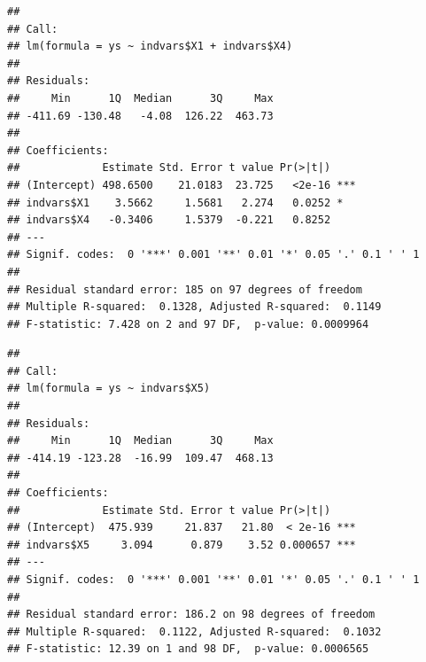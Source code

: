 \documentclass[
]{book}
\newenvironment{Shaded}{\begin{snugshade}}{\end{snugshade}}
\newcommand{\FunctionTok}[1]{\textcolor[rgb]{0.00,0.00,0.00}{#1}}
\newcommand{\NormalTok}[1]{#1}
\newcommand{\OtherTok}[1]{\textcolor[rgb]{0.56,0.35,0.01}{#1}}
\newcommand{\SpecialCharTok}[1]{\textcolor[rgb]{0.00,0.00,0.00}{#1}}
\begin{document}
\begin{Shaded}
\end{Shaded}

\begin{verbatim}
## 
## Call:
## lm(formula = ys ~ indvars$X1 + indvars$X4)
## 
## Residuals:
##     Min      1Q  Median      3Q     Max 
## -411.69 -130.48   -4.08  126.22  463.73 
## 
## Coefficients:
##             Estimate Std. Error t value Pr(>|t|)    
## (Intercept) 498.6500    21.0183  23.725   <2e-16 ***
## indvars$X1    3.5662     1.5681   2.274   0.0252 *  
## indvars$X4   -0.3406     1.5379  -0.221   0.8252    
## ---
## Signif. codes:  0 '***' 0.001 '**' 0.01 '*' 0.05 '.' 0.1 ' ' 1
## 
## Residual standard error: 185 on 97 degrees of freedom
## Multiple R-squared:  0.1328, Adjusted R-squared:  0.1149 
## F-statistic: 7.428 on 2 and 97 DF,  p-value: 0.0009964
\end{verbatim}

\begin{Shaded}
\end{Shaded}

\begin{verbatim}
## 
## Call:
## lm(formula = ys ~ indvars$X5)
## 
## Residuals:
##     Min      1Q  Median      3Q     Max 
## -414.19 -123.28  -16.99  109.47  468.13 
## 
## Coefficients:
##             Estimate Std. Error t value Pr(>|t|)    
## (Intercept)  475.939     21.837   21.80  < 2e-16 ***
## indvars$X5     3.094      0.879    3.52 0.000657 ***
## ---
## Signif. codes:  0 '***' 0.001 '**' 0.01 '*' 0.05 '.' 0.1 ' ' 1
## 
## Residual standard error: 186.2 on 98 degrees of freedom
## Multiple R-squared:  0.1122, Adjusted R-squared:  0.1032 
## F-statistic: 12.39 on 1 and 98 DF,  p-value: 0.0006565
\end{verbatim}

\begin{Shaded}
\end{Shaded}
\end{document}
